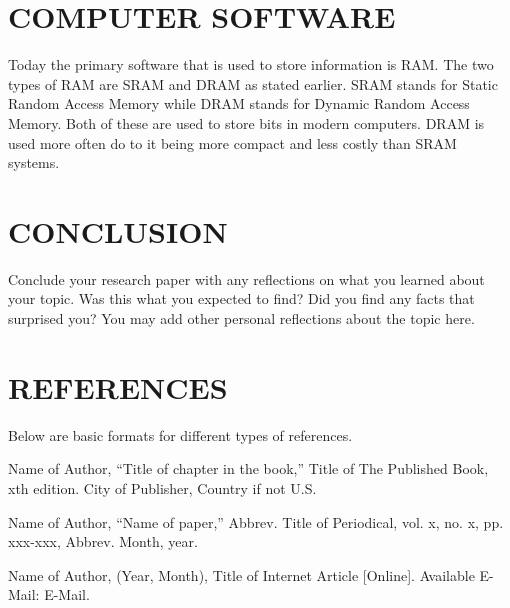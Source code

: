 \documentclass[letterpaper, 10 pt, conference]{IEEEconf}
\begin{document}
\section{COMPUTER SOFTWARE}
Today the primary software that is used to store information is RAM. The two types of RAM are SRAM and DRAM as stated earlier. SRAM stands for Static Random Access Memory while DRAM stands for Dynamic Random Access Memory. Both of these are used to store bits in modern computers. DRAM is used more often do to it being more compact and less costly than SRAM systems.

\section{CONCLUSION}

Conclude your research paper with any reflections on what you
learned about your topic. Was this what you expected to find?
Did you find any facts that surprised you? You may add other
personal reflections about the topic here.

\section*{REFERENCES}

Below are basic formats for different types of references.

\begin{enumerate}[label={[\arabic*]}]
\item Name of Author, ``Title of chapter in the book,''
Title of The Published Book, xth edition. City of
Publisher, Country if not U.S.
\item Name of Author, “Name of paper,” Abbrev.
Title of Periodical, vol. x, no. x, pp. xxx-xxx,
Abbrev. Month, year.
\item Name of Author, (Year, Month),
Title of Internet Article [Online]. Available E-Mail:
E-Mail.
\end{enumerate}
\end{document}
